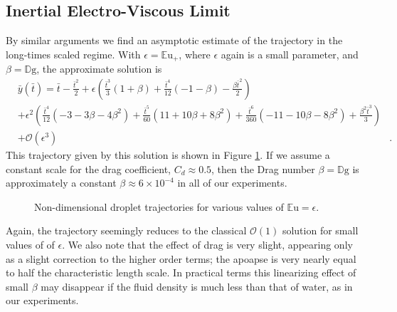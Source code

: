 \documentclass[12pt,a4paper,oneside]{book}
\begin{document}
\subsection{Inertial Electro-Viscous Limit}
By similar arguments we find an asymptotic estimate of the trajectory in the long-times scaled regime. With $\epsilon = {\mathbb{E}\mbox{u}}_+$, where $\epsilon$ again is a small parameter, and $\beta = \mathbb{D}\mbox{g}$, the approximate solution is 
\begin{eqnarray*}
&\bar{y}(\bar{t}) = \bar{t} - \frac{\bar{t}^{2}}{2} + \epsilon \left(\frac{\bar{t}^{3}}{3} \left(1 + \beta\right) + \frac{\bar{t}^{4}}{12} \left(-1 - \beta\right) - \frac{\beta \bar{t}^{2}}{2}\right)&  \\
&+ \epsilon^{2} \left(\frac{\bar{t}^{4}}{12} \left(-3 - 3 \beta - 4 \beta^{2}\right) + \frac{\bar{t}^{5}}{60} \left(11 + 10 \beta + 8 \beta^{2}\right)+ \frac{\bar{t}^{6}}{360} \left(-11 - 10 \beta - 8 \beta^{2}\right) + \frac{\beta^{2} \bar{t}^{3}}{3}\right)& \\
 &+ \mathcal{O}(\epsilon^3)&.
\end{eqnarray*}
This trajectory given by this solution is shown in Figure \ref{fig:long_times}. If we assume a constant scale for the drag coefficient, $C_d \approx 0.5$, then  the Drag number $\beta = \mathbb{D}\mbox{g}$ is approximately a constant $\beta \approx 6 \times 10^{-4}$ in all of our experiments.
\begin{figure}[htb]
    \centering
    
    \caption{Non-dimensional droplet trajectories for various values of $\mathbb{E}\mbox{u}=\epsilon$.}
     \label{fig:long_times}
\end{figure}
Again, the trajectory seemingly reduces to the classical $\mathcal{O}(1)$ solution for small values of of $\epsilon$. We also note that the effect of drag is very slight, appearing only as a slight correction to the higher order terms; the apoapse is very nearly equal to half the characteristic length scale. In practical terms this linearizing effect of small $\beta$ may disappear if the fluid density is much less than that of water, as in our experiments.
 
\end{document}

